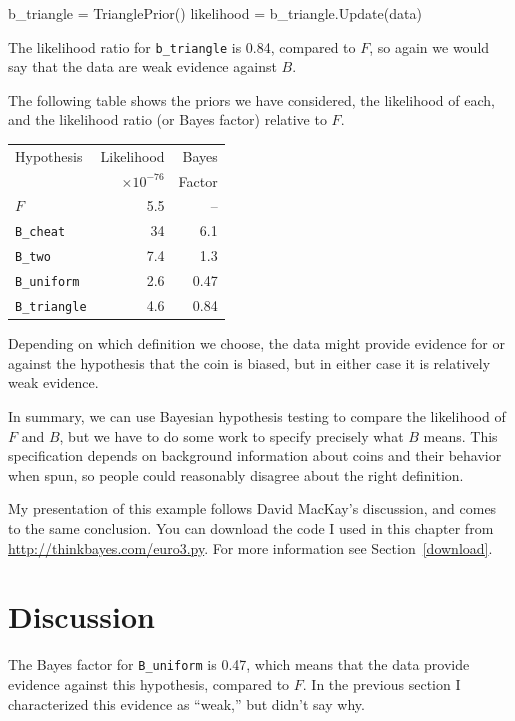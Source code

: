 \documentclass[12pt]{book}
\theoremstyle{exercise}
\begin{document}
\begin{code}
    b_triangle = TrianglePrior()
    likelihood = b_triangle.Update(data)
\end{code}

The likelihood ratio for \verb"b_triangle" is 0.84, compared to $F$, so
again we would say that the data are weak evidence against $B$.

The following table shows the priors we have considered, the
likelihood of each, and the likelihood ratio (or Bayes factor)
relative to $F$.

\begin{tabular}{|l|r|r|}
\hline
Hypothesis   & Likelihood & Bayes  \\
             & $\times 10^{-76}$ & Factor  \\
\hline
$F$              & 5.5   & --   \\
\verb"B_cheat"  & 34   &  6.1   \\
\verb"B_two"     & 7.4   &  1.3   \\
\verb"B_uniform"  & 2.6   &  0.47   \\
\verb"B_triangle"  & 4.6   &  0.84   \\
\hline
\end{tabular}

Depending on which definition we choose, the data might provide
evidence for or against the hypothesis that the coin is biased, but
in either case it is relatively weak evidence.

In summary, we can use Bayesian hypothesis testing to compare the
likelihood of $F$ and $B$, but we have to do some work to specify
precisely what $B$ means.  This specification depends on background
information about coins and their behavior when spun, so people
could reasonably disagree about the right definition.

My presentation of this example follows
David MacKay's discussion, and comes to the same conclusion.
You can download the code I used in this chapter from
\url{http://thinkbayes.com/euro3.py}.
  For more information
see Section~\ref{download}.

\section{Discussion}

The Bayes factor for \verb"B_uniform" is 0.47, which means
that the data provide evidence against this hypothesis, compared
to $F$.  In the previous section I characterized this evidence
as ``weak,'' but didn't say why.
\end{document}
